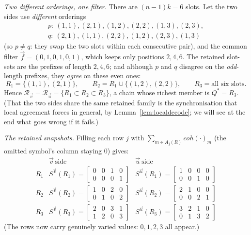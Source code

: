 \medskip\noindent\emph{Two different orderings, one filter.}
There are $(n-1)k=6$ slots.  Let the two sides use \emph{different} orderings
\begin{gather*}
p:\ (1,1),(2,1),(1,2),(2,2),(1,3),(2,3),\\
q:\ (2,1),(1,1),(2,2),(1,2),(2,3),(1,3)
\end{gather*}
(so $p\ne q$: they swap the two slots within each consecutive pair), and the common
filter $\vec f=(0,1,0,1,0,1)$, which keeps only positions $2,4,6$.  The retained
slot-sets are the prefixes of length $2,4,6$; and although $p$ and $q$ disagree on
the \emph{odd}-length prefixes, they \emph{agree} on these even ones:
\[
R_1=\{(1,1),(2,1)\},\qquad
R_2=R_1\cup\{(1,2),(2,2)\},\qquad
R_3=\text{all six slots}.
\]
Hence $\mathcal R_{\vec v}=\mathcal R_{\vec u}=\{R_1\subset R_2\subset R_3\}$, a
chain whose richest member is $Q^\ast=R_3$.  (That the two sides share the same
retained family is the synchronisation that local agreement forces in general, by
Lemma~\ref{lem:localdecode}; we will see at the end what goes wrong if it fails.)

\medskip\noindent\emph{The retained snapshots.}
Filling each row $j$ with $\sum_{m\in A_j(R)}coh(\cdot)_m$ (the omitted symbol's
column staying $0$) gives:
\[
\renewcommand{\arraystretch}{2.4}
\begin{array}{c|c|c}
 & \vec v\ \text{side} & \vec u\ \text{side}\\\hline
R_1 & S^{\vec v}(R_1)=\begin{bmatrix}0&0&1&0\\0&0&0&1\end{bmatrix}
    & S^{\vec u}(R_1)=\begin{bmatrix}1&0&0&0\\0&0&1&0\end{bmatrix}\\
R_2 & S^{\vec v}(R_2)=\begin{bmatrix}1&0&2&0\\0&1&0&2\end{bmatrix}
    & S^{\vec u}(R_2)=\begin{bmatrix}2&1&0&0\\0&0&2&1\end{bmatrix}\\
R_3 & S^{\vec v}(R_3)=\begin{bmatrix}2&0&3&1\\1&2&0&3\end{bmatrix}
    & S^{\vec u}(R_3)=\begin{bmatrix}3&2&1&0\\0&1&3&2\end{bmatrix}
\end{array}
\]
(The rows now carry genuinely varied values: $0,1,2,3$ all appear.)


